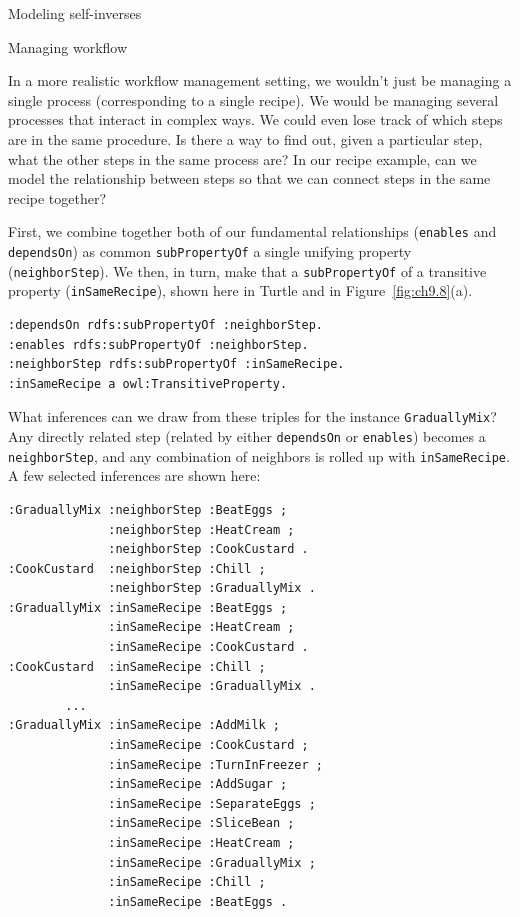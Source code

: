 \begin{challenge}{Modeling self-inverses}
\begin{challenge}{Managing workflow}

In a more realistic workflow management setting, we wouldn't just be
managing a single process (corresponding to a single recipe). We would
be managing several processes that interact in complex ways. We could
even lose track of which steps are in the same procedure. Is there a way
to find out, given a particular step, what the other steps in the same
process are? In our recipe example, can we model the relationship
between steps so that we can connect steps in the same recipe together?

\solution

First, we combine together both of our fundamental relationships
(\texttt{enables} and \texttt{dependsOn}) as common \texttt{subPropertyOf} a single unifying
property (\texttt{neighborStep}). We then, in turn, make that a \texttt{subPropertyOf} of
a transitive property (\texttt{inSameRecipe}), shown here in Turtle and in Figure~\ref{fig:ch9.8}(a).

\begin{lstlisting}
:dependsOn rdfs:subPropertyOf :neighborStep.
:enables rdfs:subPropertyOf :neighborStep.
:neighborStep rdfs:subPropertyOf :inSameRecipe.
:inSameRecipe a owl:TransitiveProperty.
\end{lstlisting}

What inferences can we draw from these triples for the instance
\texttt{GraduallyMix}? Any directly related step (related by either \texttt{dependsOn} or
\texttt{enables}) becomes a \texttt{neighborStep}, and any combination of neighbors is
rolled up with \texttt{inSameRecipe}. A few selected inferences are shown here:

\begin{lstlisting}
:GraduallyMix :neighborStep :BeatEggs ;
              :neighborStep :HeatCream ;
              :neighborStep :CookCustard .
:CookCustard  :neighborStep :Chill ;
              :neighborStep :GraduallyMix .
:GraduallyMix :inSameRecipe :BeatEggs ;
              :inSameRecipe :HeatCream ;
              :inSameRecipe :CookCustard .
:CookCustard  :inSameRecipe :Chill ;
              :inSameRecipe :GraduallyMix .
        ...
:GraduallyMix :inSameRecipe :AddMilk ;
              :inSameRecipe :CookCustard ;
              :inSameRecipe :TurnInFreezer ;
              :inSameRecipe :AddSugar ;
              :inSameRecipe :SeparateEggs ;
              :inSameRecipe :SliceBean ;
              :inSameRecipe :HeatCream ;
              :inSameRecipe :GraduallyMix ;
              :inSameRecipe :Chill ;
              :inSameRecipe :BeatEggs .
\end{lstlisting}




\end{challenge}
\end{challenge}
